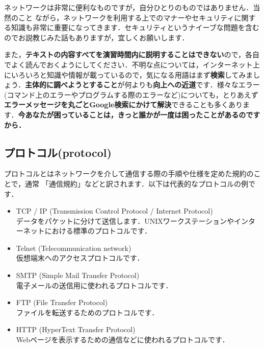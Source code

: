 \documentclass{jarticle}
\begin{document}
\vspace{1em}

ネットワークは非常に便利なものですが，自分ひとりのものではありません．当然のこと
ながら，ネットワークを利用する上でのマナーやセキュリティに関する知識も非常に重要になってきます．セキュリティというナイーブな問題を含むのでお説教じみた話もありますが，宜しくお願いします．

また，{\bf テキストの内容すべてを演習時間内に説明することはできない}ので，各自でよく読んでおくようにしてください．不明な点については，インターネット上にいろいろと知識や情報が載っているので，気になる用語はまず{\bf 検索}してみましょう．{\bf 主体的に調べようとすること}が何よりも{\bf 向上への近道}です．様々なエラー(コマンド上のエラーやプログラムする際のエラーなど)についても，とりあえず{\bf エラーメッセージを丸ごとGoogle検索にかけて解決}できることも多くあります．{\bf 今あなたが困っていることは，きっと誰かが一度は困ったことがあるのですから．}

\subsection{プロトコル(protocol)}
プロトコルとはネットワークを介して通信する際の手順や仕様を定めた規約のことで，通常
「通信規約」などと訳されます．以下は代表的なプロトコルの例です．

\begin{itemize}
\item TCP / IP (Transmission Control Protocol / Internet Protocol)\\
データをパケットに分けて送信します．UNIXワークステーションやインターネットにおける標準のプロトコルです．
\item Telnet (Telecommunication network)\\
仮想端末へのアクセスプロトコルです．
\item SMTP (Simple Mail Transfer Protocol)\\
電子メールの送信用に使われるプロトコルです．
\item FTP (File Transfer Protocol)\\
ファイルを転送するためのプロトコルです．
\item HTTP (HyperText Transfer Protocol)\\
Webページを表示するための通信などに使われるプロトコルです．
\end{itemize}
\end{document}
